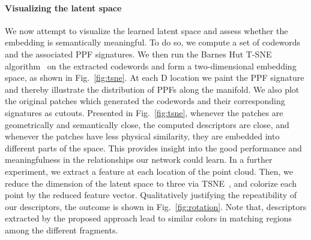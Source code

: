 \paragraph{Visualizing the latent space}
We now attempt to visualize the learned latent space and assess whether the embedding is semantically meaningful. To do so, we compute a set of codewords and the associated PPF signatures. We then run the Barnes Hut T-SNE algorithm~\cite{tsne,barneshut} on the extracted codewords and form a two-dimensional embedding space, as shown in Fig.~\ref{fig:tsne}. At each D location we paint the PPF signature and thereby illustrate the distribution of PPFs along the manifold. We also plot the original patches which generated the codewords and their corresponding signatures as cutouts. Presented in Fig.~\ref{fig:tsne}, whenever the patches are geometrically and semantically close, the computed descriptors are close, and whenever the patches have less physical similarity, they are embedded into different parts of the space. This provides insight into the good performance and meaningfulness in the relationships our network could learn.
In a further experiment, we extract a feature at each location of the point cloud. Then, we reduce the dimension of the latent space to three via TSNE~\cite{tsne}, and colorize each point by the reduced feature vector. Qualitatively justifying the repeatibility of our descriptors, the outcome is shown in Fig.~\ref{fig:rotation}. Note that, descriptors extracted by the proposed approach lead to similar colors in matching regions among the different fragments. 